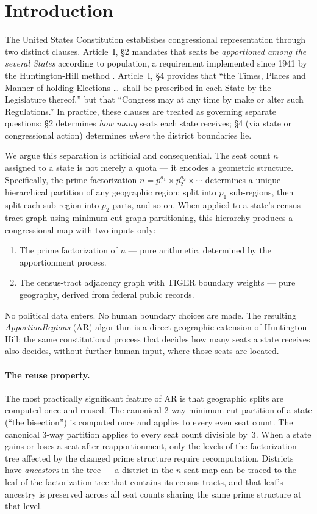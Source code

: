 \section{Introduction}
\label{sec:intro}

The United States Constitution establishes congressional representation through
two distinct clauses. Article~I, \S2 mandates that seats be
\emph{apportioned among the several States} according to population, a
requirement implemented since 1941 by the Huntington-Hill method
\citep{balinski2001fair}. Article~I, \S4 provides that ``the Times, Places and
Manner of holding Elections \ldots\ shall be prescribed in each State by the
Legislature thereof,'' but that ``Congress may at any time by make or alter
such Regulations.'' In practice, these clauses are treated as governing
separate questions: \S2 determines \emph{how many} seats each state receives;
\S4 (via state or congressional action) determines \emph{where} the district
boundaries lie.

We argue this separation is artificial and consequential. The seat count $n$
assigned to a state is not merely a quota --- it encodes a geometric structure.
Specifically, the prime factorization $n = p_1^{a_1} \times p_2^{a_2} \times
\cdots$ determines a unique hierarchical partition of any geographic region:
split into $p_1$ sub-regions, then split each sub-region into $p_2$ parts, and
so on. When applied to a state's census-tract graph using minimum-cut graph
partitioning, this hierarchy produces a congressional map with two inputs only:
\begin{enumerate}
  \item The prime factorization of $n$ --- pure arithmetic, determined by the
        apportionment process.
  \item The census-tract adjacency graph with TIGER boundary weights --- pure
        geography, derived from federal public records.
\end{enumerate}
No political data enters. No human boundary choices are made. The resulting
\emph{ApportionRegions} (AR) algorithm is a direct geographic
extension of Huntington-Hill: the same constitutional process that decides how
many seats a state receives also decides, without further human input, where
those seats are located.

\paragraph{The reuse property.}
The most practically significant feature of AR is that geographic splits are
computed once and reused. The canonical 2-way minimum-cut partition of a state
(``the bisection'') is computed once and applies to every even seat count.
The canonical 3-way partition applies to every seat count divisible by~3.
When a state gains or loses a seat after reapportionment, only the levels of
the factorization tree affected by the changed prime structure require
recomputation. Districts have \emph{ancestors} in the tree --- a district
in the $n$-seat map can be traced to the leaf of the factorization tree that
contains its census tracts, and that leaf's ancestry is preserved across all
seat counts sharing the same prime structure at that level.

